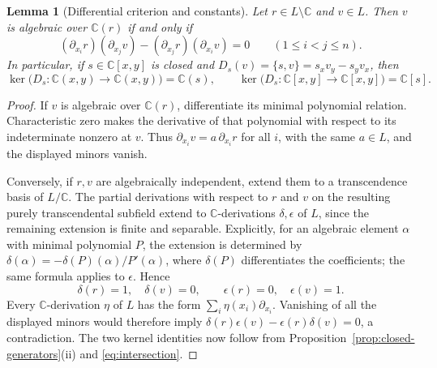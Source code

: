 \documentclass[11pt,reqno]{amsart}
\numberwithin{equation}{section}
\theoremstyle{plain}
\newtheorem{lemma}[theorem]{Lemma}
\theoremstyle{definition}
\theoremstyle{remark}
\newcommand{\C}{\mathbb C}
\begin{document}
\begin{lemma}[Differential criterion and constants]\label{lem:differential-constants}
Let $r\in L\setminus\C$ and $v\in L$. Then $v$ is algebraic
over $\C(r)$ if and only if
\[
 (\partial_{x_i}r)(\partial_{x_j}v)
 -(\partial_{x_j}r)(\partial_{x_i}v)=0
 \qquad(1\le i<j\le n).
\]
In particular, if $s\in\C[x,y]$ is closed and
$D_s(v)=\{s,v\}=s_xv_y-s_yv_x$, then
\[
 \ker\bigl(D_s:\C(x,y)\to\C(x,y)\bigr)=\C(s),
 \qquad
 \ker\bigl(D_s:\C[x,y]\to\C[x,y]\bigr)=\C[s].
\]
\end{lemma}
\begin{proof}
If $v$ is algebraic over $\C(r)$, differentiate its minimal
polynomial relation. Characteristic zero makes the derivative of that
polynomial with respect to its indeterminate nonzero at $v$. Thus
$\partial_{x_i}v=a\,\partial_{x_i}r$ for all $i$, with the same
$a\in L$, and the displayed minors vanish.

Conversely, if $r,v$ are algebraically independent, extend them to a
transcendence basis of $L/\C$. The partial derivations with respect
to $r$ and $v$ on the resulting purely transcendental subfield extend
to $\C$-derivations $\delta,\epsilon$ of $L$, since the remaining
extension is finite and separable. Explicitly, for an algebraic
element $\alpha$ with minimal polynomial $P$, the extension is
determined by $\delta(\alpha)=-\delta(P)(\alpha)/P'(\alpha)$,
where $\delta(P)$ differentiates the coefficients; the same formula
applies to $\epsilon$. Hence
\[
 \delta(r)=1,\quad\delta(v)=0,\qquad
 \epsilon(r)=0,\quad\epsilon(v)=1.
\]
Every $\C$-derivation $\eta$ of $L$ has the form
$\sum_i\eta(x_i)\partial_{x_i}$. Vanishing of all the displayed
minors would therefore imply
$\delta(r)\epsilon(v)-\epsilon(r)\delta(v)=0$, a contradiction.
The two kernel identities now follow from
Proposition~\ref{prop:closed-generators}(ii) and
\eqref{eq:intersection}.
\end{proof}
\end{document}
